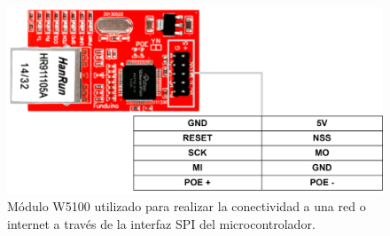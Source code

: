\begin{figure}[H]
    \centering
    \includegraphics[width=0.7\linewidth]{Figuras/datalogger/Hardware/moduleW5100.png}
    \caption{Módulo W5100 utilizado para realizar la conectividad a una red o internet a través de la interfaz SPI del microcontrolador.}
    \label{fig:moduleW5100}
\end{figure}

